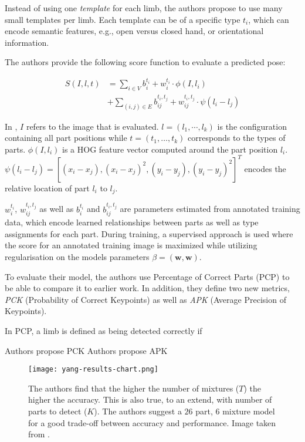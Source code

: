 Instead of using one \textit{template} for each limb, the authors propose to use many small templates per limb.
Each template can be of a specific type $t_i$, which can encode semantic features, e.g., open versus closed hand, or orientational information.

The authors provide the following score function to evaluate a predicted pose:

\begin{equation}
    \label{eq:yang-score}
    \begin{split}
        S(I, l, t) 
        &= \sum_{i \in V} b_i^{t_i} + w_i^{t_i} \cdot \phi(I, l_i) \\
        &+ \sum_{(i,j) \in E} b_{ij}^{t_i, t_j} + w_{ij}^{t_i, t_j} \cdot \psi(l_i - l_j)
    \end{split}
\end{equation}

In , $I$ refers to the image that is evaluated.
$l = (l_1, \cdots, l_k)$ is the configuration containing all part positions while $t = (t_1, \dots, t_k)$ corresponds to the types of parts.
$\phi(I, l_i)$ is a HOG feature vector \cite{dalal_histograms_2005} computed around the part position $l_i$.
$\psi(l_i - l_j) = [(x_i - x_j), (x_i - x_j)^2, (y_i - y_j), (y_i - y_j)^2]^T$ encodes the relative location of part $l_i$ to $l_j$.

$w_i^{t_i}$, $w_{ij}^{t_i, t_j}$ as well as $b_i^{t_i}$ and $b_{ij}^{t_i, t_j}$ are parameters estimated from annotated training data, which encode learned relationships between parts as well as type assignments for each part.
During training, a supervised approach is used where the score for an annotated training image is maximized while utilizing regularisation on the models parameters $\beta = (\bm{w}, \bm{w})$.

To evaluate their model, the authors use Percentage of Correct Parts (PCP) \cite{ferrari_progressive_2008} to be able to compare it to earlier work.
In addition, they define two new metrics, \textit{PCK} (Probability of Correct Keypoints) as well as \textit{APK} (Average Precision of Keypoints).

In PCP, a limb is defined as being detected correctly if 

Authors propose PCK
Authors propose APK

\begin{figure}[htb!]
    \centering
    \texttt{[image: yang-results-chart.png]}
    \caption{The authors find that the higher the number of mixtures ($T$) the higher the accuracy. This is also true, to an extend, with number of parts to detect ($K$). The authors suggest a $26$ part, $6$ mixture model for a good trade-off between accuracy and performance. Image taken from \cite{yang_articulated_2011}.}
    \label{fig:yang-results-chart}
\end{figure}

